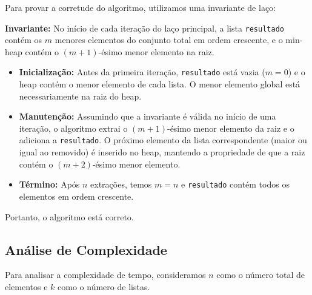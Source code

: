 \documentclass[a4paper,12pt]{article}
\begin{document}
Para provar a corretude do algoritmo, utilizamos uma invariante de laço:

\textbf{Invariante:} No início de cada iteração do laço principal, a lista \texttt{resultado} contém os $m$ menores elementos do conjunto total em ordem crescente, e o min-heap contém o $(m+1)$-ésimo menor elemento na raiz.

\begin{itemize}
    \item \textbf{Inicialização:} Antes da primeira iteração, \texttt{resultado} está vazia ($m=0$) e o heap contém o menor elemento de cada lista. O menor elemento global está necessariamente na raiz do heap.
    
    \item \textbf{Manutenção:} Assumindo que a invariante é válida no início de uma iteração, o algoritmo extrai o $(m+1)$-ésimo menor elemento da raiz e o adiciona a \texttt{resultado}. O próximo elemento da lista correspondente (maior ou igual ao removido) é inserido no heap, mantendo a propriedade de que a raiz contém o $(m+2)$-ésimo menor elemento.
    
    \item \textbf{Término:} Após $n$ extrações, temos $m=n$ e \texttt{resultado} contém todos os elementos em ordem crescente.
\end{itemize}

Portanto, o algoritmo está correto.

\subsection*{Análise de Complexidade}

Para analisar a complexidade de tempo, consideramos $n$ como o número total de elementos e $k$ como o número de listas.
\end{document}
